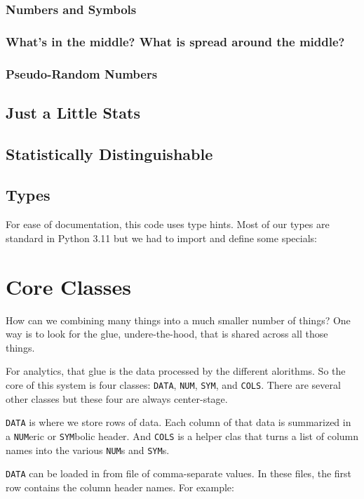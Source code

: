 \documentclass[landscape,	DIV=calc,%
							paper=letter,%
							fontsize=10pt,%
							twocolumn]{scrartcl}	 					%
\newcommand{\VERSION}{3.11}
\begin{document}
\subsubsection{Numbers and Symbols}
\subsubsection{What's in the middle? What is spread around the middle?}

\subsubsection{Pseudo-Random Numbers}

\subsection{Just a Little Stats}
\subsection{Statistically Distinguishable}
\subsection{Types}
For ease of documentation, this code uses type hints.  Most of our types are standard in Python {\VERSION}
but we had to import and define some specials:



\section{Core Classes}
How can we  combining many things into a much smaller number of things? One way is to look for
the glue, undere-the-hood, that is shared across all those things.

For analytics, that glue is the data processed by the different alorithms. So the core
of this system is 
four classes: 
\verb+DATA+, 
\verb+NUM+, 
\verb+SYM+, 
and \verb+COLS+. There are several other classes but these four are always center-stage.

\verb+DATA+ is where we store rows of data. Each column of that data is summarized
in a \verb+NUM+eric or \verb+SYM+bolic header. And \verb+COLS+ is a helper clas
that turns a list of column names into the various \verb+NUM+s and \verb+SYM+s.

\verb+DATA+ can be loaded in from file of comma-separate values. In these files,
the first row contains the column header names. For example:
\end{document}
